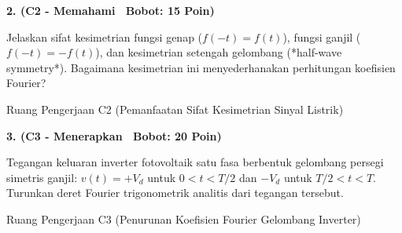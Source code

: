 \documentclass[10pt,a4paper]{article}
\begin{document}
\vspace{1mm}

\noindent\textbf{2. (C2 - Memahami \textbar\ Bobot: 15 Poin)}\par\vspace{0.5mm}
{\footnotesize Jelaskan sifat kesimetrian fungsi genap ($f(-t) = f(t)$), fungsi ganjil ($f(-t) = -f(t)$), dan kesimetrian setengah gelombang (*half-wave symmetry*). Bagaimana kesimetrian ini menyederhanakan perhitungan koefisien Fourier?}
\begin{answerbox}{Ruang Pengerjaan C2 (Pemanfaatan Sifat Kesimetrian Sinyal Listrik)}
  \vspace{2.1cm}
\end{answerbox}

\vspace{1mm}

\noindent\textbf{3. (C3 - Menerapkan \textbar\ Bobot: 20 Poin)}\par\vspace{0.5mm}
\noindent\begin{minipage}[t]{0.60\textwidth}%
  {\footnotesize Tegangan keluaran inverter fotovoltaik satu fasa berbentuk gelombang persegi simetris ganjil: $v(t) = +V_d$ untuk $0 < t < T/2$ dan $-V_d$ untuk $T/2 < t < T$. Turunkan deret Fourier trigonometrik analitis dari tegangan tersebut.}%
\end{minipage}%
\hfill%
\begin{minipage}[t]{0.37\textwidth}%
  \centering
\end{minipage}\par\vspace{1mm}
\begin{answerbox}{Ruang Pengerjaan C3 (Penurunan Koefisien Fourier Gelombang Inverter)}
  \vspace{2.8cm}
\end{answerbox}
\end{document}

